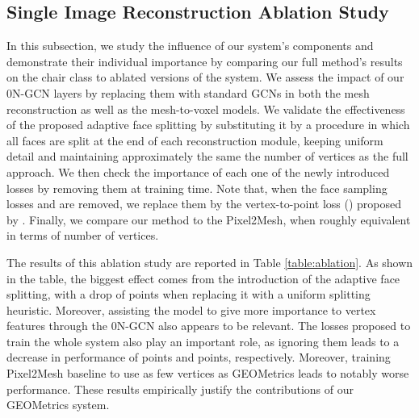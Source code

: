 \documentclass{article}
\begin{document}
\subsection{Single Image Reconstruction Ablation Study}

In this subsection, we study the influence of our system's components and demonstrate their individual importance by comparing our full method's results on the chair class to ablated versions of the system. We assess the impact of our 0N-GCN layers by replacing them with standard GCNs \cite{GCN} in both the mesh reconstruction as well as the mesh-to-voxel models. We validate the effectiveness of the proposed adaptive face splitting by substituting it by a procedure in which all faces are split at the end of each reconstruction module, keeping uniform detail and maintaining approximately the same the number of vertices as the full approach. We then check the importance of each one of the newly introduced losses by removing them at training time. Note that, when the face sampling losses  and  are removed, we replace them by the vertex-to-point loss () proposed by \citet{Pixel2Mesh}. Finally, we compare our method to the Pixel2Mesh, when roughly equivalent in terms of number of vertices.

The results of this ablation study are reported in Table \ref{table:ablation}. As shown in the table, the biggest effect comes from the introduction of the adaptive face splitting, with a drop of  points when replacing it with a uniform splitting heuristic. Moreover, assisting the model to give more importance to vertex features through the 0N-GCN also appears to be relevant. The losses proposed to train the whole system also play an important role, as ignoring them leads to a decrease in performance of  points and  points, respectively. Moreover, training Pixel2Mesh baseline to use as few vertices as GEOMetrics leads to notably worse performance. These results empirically justify the contributions of our GEOMetrics system.



\begin{table} [H]
  \caption{GEOMetrics ablation compared to full method (ours) and Pixel2Mesh. Results reported as mean F1 score on the chair class.
} 
\vspace{0.2cm}
  \centering
  \label{table:ablation}
\end{table}
\vspace{-3mm}
\end{document}
